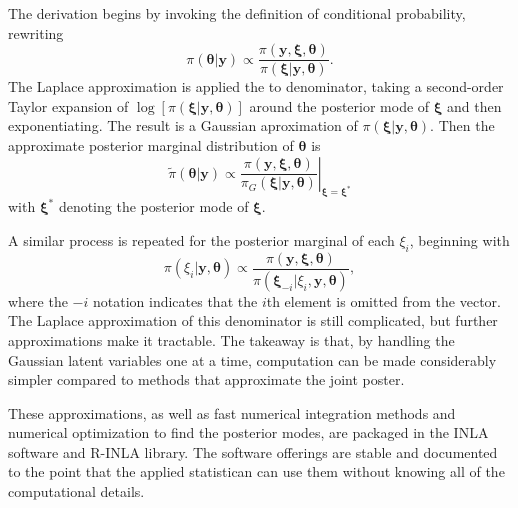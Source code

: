 \documentclass[]{interact}
\begin{document}
The derivation begins by invoking the definition of conditional probability,
rewriting
\begin{displaymath}
\pi\left(\boldsymbol{\theta} | \mathbf{y}\right)
\propto \frac{\pi\left(\mathbf{y}, \boldsymbol{\xi}, \boldsymbol{\theta}\right)}
{\pi\left(\boldsymbol{\xi} | \mathbf{y}, \boldsymbol{\theta}\right)}.
\end{displaymath}
The Laplace approximation is applied the to denominator, taking a second-order
Taylor expansion of
\(\log\left[\pi\left(\boldsymbol{\xi} | \mathbf{y}, \boldsymbol{\theta}\right)\right]\)
around the posterior mode of \(\boldsymbol{\xi}\) and then exponentiating. The
result is a Gaussian aproximation of
\(\pi\left(\boldsymbol{\xi} | \mathbf{y}, \boldsymbol{\theta}\right)\). Then
the approximate posterior marginal distribution of \(\boldsymbol{\theta}\) is
\begin{displaymath}
\tilde{\pi}\left(\boldsymbol{\theta} | \mathbf{y}\right)
\propto \left.\frac{\pi\left(\mathbf{y}, \boldsymbol{\xi}, \boldsymbol{\theta}\right)}
{\pi_{G}\left(\boldsymbol{\xi} | \mathbf{y}, \boldsymbol{\theta}\right)}
\right|_{\boldsymbol{\xi}=\boldsymbol{\xi}^{*}}
\end{displaymath}
with \(\boldsymbol{\xi}^{*}\) denoting the posterior mode of
\(\boldsymbol{\xi}\).

A similar process is repeated for the posterior marginal of each \(\xi_{i}\),
beginning with
\begin{displaymath}
\pi\left(\xi_{i} | \mathbf{y}, \boldsymbol{\theta}\right)
\propto \frac{\pi\left(\mathbf{y}, \boldsymbol{\xi}, \boldsymbol{\theta}\right)}
{\pi\left(\boldsymbol{\xi}_{-i} | \xi_{i}, \mathbf{y}, \boldsymbol{\theta}\right)},
\end{displaymath}
where the \(-i\) notation indicates that the \(i\)th element is omitted from
the vector. The Laplace approximation of this denominator is still complicated,
but further approximations make it tractable. The takeaway is that, by
handling the Gaussian latent variables one at a time, computation can be made
considerably simpler compared to methods that approximate the joint poster.

These approximations, as well as fast numerical integration methods and
numerical optimization to find the posterior modes, are packaged in the INLA
software and R-INLA library. The software offerings are stable and documented
to the point that the applied statistican can use them without knowing all of
the computational details.
\end{document}
